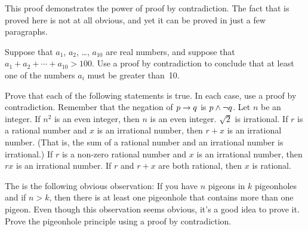 This proof demonstrates the power of proof by contradiction.
The fact that is proved here is not at all obvious, and yet it can
be proved in just a few paragraphs.



\begin{exercises}

\problem Suppose that $a_1$, $a_2$, \dots, $a_{10}$ are real numbers,
and suppose that $a_1+a_2+\cdots+a_{10}>100$.  Use a proof by contradiction
to conclude that at least one of the numbers $a_i$ must be greater than~10.


\problem Prove that each of the following statements is true. 
In each case, use a proof by contradiction.  Remember that the
negation of $p\rightarrow q$ is $p \land \lnot q$.
\ppart Let $n$ be an integer.  If $n^2$ is an even integer, then 
$n$ is an even integer.  
\ppart $\sqrt{2}$ is irrational.
\ppart If $r$ is a rational number and $x$ is an
irrational number, then $r+x$ is an irrational number. (That is, the
sum of a rational number and an irrational number is irrational.)
\ppart If $r$ is a non-zero rational number and $x$ is an
irrational number, then $rx$ is an irrational number.    
\ppart If $r$ and $r+x$ are both rational, then $x$ is rational.

\problem The  is the following obvious
observation:  If you have $n$ pigeons in $k$ pigeonholes and if $n>k$,
then there is at least one pigeonhole that contains more than
one pigeon.  Even though this observation seems obvious, it's a
good idea to prove it.  Prove the pigeonhole principle using a
proof by contradiction.

\end{exercises}




